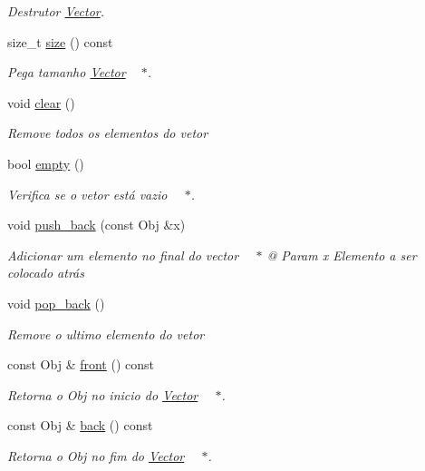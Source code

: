 \begin{DoxyCompactItemize}
\begin{DoxyCompactList}\small\item\em Destrutor \hyperlink{class_vector}{Vector}. \end{DoxyCompactList}\item 
size\+\_\+t \hyperlink{class_vector_afe1de779df754eedd2a8a0be4d796643}{size} () const 
\begin{DoxyCompactList}\small\item\em Pega tamanho \hyperlink{class_vector}{Vector}   $\ast$. \end{DoxyCompactList}\item 
void \hyperlink{class_vector_ae7234417f87946c4bfcccf738af75837}{clear} ()
\begin{DoxyCompactList}\small\item\em Remove todos os elementos do vetor   \end{DoxyCompactList}\item 
bool \hyperlink{class_vector_a7d4b2337c2da133cc4868ce755730644}{empty} ()
\begin{DoxyCompactList}\small\item\em Verifica se o vetor está vazio   $\ast$. \end{DoxyCompactList}\item 
void \hyperlink{class_vector_a0edf2c3ff13e5c83ddea6ee5c8c8ec4f}{push\+\_\+back} (const Obj \&x)
\begin{DoxyCompactList}\small\item\em Adicionar um elemento no final do vector   $\ast$ @ Param x Elemento a ser colocado atrás    \end{DoxyCompactList}\item 
void \hyperlink{class_vector_a616d10a9af01df582450d1ba6fd2e1bc}{pop\+\_\+back} ()
\begin{DoxyCompactList}\small\item\em Remove o ultimo elemento do vetor    \end{DoxyCompactList}\item 
const Obj \& \hyperlink{class_vector_a239e09c772177108354d25fea6974bbd}{front} () const 
\begin{DoxyCompactList}\small\item\em Retorna o Obj no inicio do \hyperlink{class_vector}{Vector}   $\ast$. \end{DoxyCompactList}\item 
const Obj \& \hyperlink{class_vector_a67d8538b1d68f7a099622383565839d9}{back} () const 
\begin{DoxyCompactList}\small\item\em Retorna o Obj no fim do \hyperlink{class_vector}{Vector}   $\ast$. \end{DoxyCompactList}\item 

\end{DoxyCompactItemize}
